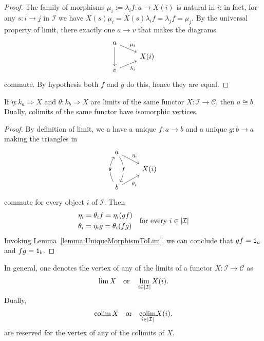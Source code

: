 \begin{proof}
  The family of morphisms \(\mu_i := \lambda_i f : a \to X(i)\) is natural in
  \(i\): in fact, for any \(s : i \to j\) in \(\mathcal{I}\) we have
  \(X(s) \mu_i = X(s) \lambda_i f = \lambda_j f = \mu_j\).  By the universal property of
  limit, there exactly one \(a \to v\) that makes the diagrams
  \[
    \begin{tikzcd}[row sep=tiny]
      a \ar["{\mu_i}", dr] \ar["", dd, swap] \\
      & X(i) \\
      v \ar["{\lambda_i}", ur, swap]
    \end{tikzcd}
  \]
  commute. By hypothesis both \(f\) and \(g\) do this, hence they are
  equal.
\end{proof}

\begin{proposition}\label{proposition:LimitsHaveIsomorphicObjects}
  If \(\eta : k_a \Rightarrow X\) and \(\theta : k_b \Rightarrow X\) are limits of the same functor
  \(X : \mathcal{I} \to \mathcal{C}\), then \(a \cong b\). Dually, colimits of the same functor
  have isomorphic vertices.
\end{proposition}

\begin{proof}
  By definition of limit, we a have a unique \(f : a \to b\) and a unique
  \(g : b \to a\) making the triangles in
  \[
    \begin{tikzcd}[row sep=small]
      a \ar["{\eta_i}", dr] \ar["f" description, dd, bend left] \\
      & X(i) \\
      b \ar["{\theta_i}", ur, swap] \ar["g" description, uu, bend left]
    \end{tikzcd}
  \]
  commute for every object \(i\) of \(\mathcal{I}\). Then
  \[
    \begin{aligned}
      & \eta_i = \theta_i f = \eta_i (gf) \\
      & \theta_i = \eta_i g = \theta_i (fg)
    \end{aligned} \quad \text{for every } i \in \left\lvert\mathcal{I}\right\rvert
  \]
  Invoking Lemma~\ref{lemma:UniqueMorphismToLim}, we can conclude that
  \(gf = \mathtt 1_a\) and \(fg = \mathtt 1_b\).
\end{proof}

In general, one denotes the vertex of any of the limits of a functor
\(X : \mathcal{I} \to \mathcal{C}\) as
\[
  \lim X \quad\text{or}\quad \lim_{i \in \left\lvert\mathcal{I}\right\rvert} X(i) .
\]
Dually,
\[
  \operatorname{colim} X \quad\text{or}\quad \underset{i \in \left\lvert\mathcal{I}\right\rvert}{\operatorname{colim}} X(i) .
\]
are reserved for the vertex of any of the colimits of \(X\).



